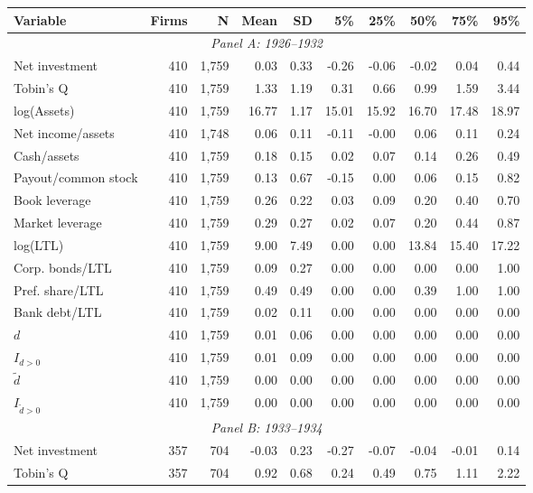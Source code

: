 \begin{threeparttable}
\begin{tabular}{lrrrrrrrrr}
\toprule
Variable & Firms & N & Mean & SD & 5\% & 25\% & 50\% & 75\% & 95\% \\
\midrule
\multicolumn{10}{c}{\textit{Panel A: 1926--1932}} \\
\midrule
Net investment & 410 & 1,759 & 0.03 & 0.33 & -0.26 & -0.06 & -0.02 & 0.04 & 0.44 \\
Tobin's Q & 410 & 1,759 & 1.33 & 1.19 & 0.31 & 0.66 & 0.99 & 1.59 & 3.44 \\
log(Assets) & 410 & 1,759 & 16.77 & 1.17 & 15.01 & 15.92 & 16.70 & 17.48 & 18.97 \\
Net income/assets & 410 & 1,748 & 0.06 & 0.11 & -0.11 & -0.00 & 0.06 & 0.11 & 0.24 \\
Cash/assets & 410 & 1,759 & 0.18 & 0.15 & 0.02 & 0.07 & 0.14 & 0.26 & 0.49 \\
Payout/common stock & 410 & 1,759 & 0.13 & 0.67 & -0.15 & 0.00 & 0.06 & 0.15 & 0.82 \\
Book leverage & 410 & 1,759 & 0.26 & 0.22 & 0.03 & 0.09 & 0.20 & 0.40 & 0.70 \\
Market leverage & 410 & 1,759 & 0.29 & 0.27 & 0.02 & 0.07 & 0.20 & 0.44 & 0.87 \\
log(LTL) & 410 & 1,759 & 9.00 & 7.49 & 0.00 & 0.00 & 13.84 & 15.40 & 17.22 \\
Corp. bonds/LTL & 410 & 1,759 & 0.09 & 0.27 & 0.00 & 0.00 & 0.00 & 0.00 & 1.00 \\
Pref. share/LTL & 410 & 1,759 & 0.49 & 0.49 & 0.00 & 0.00 & 0.39 & 1.00 & 1.00 \\
Bank debt/LTL & 410 & 1,759 & 0.02 & 0.11 & 0.00 & 0.00 & 0.00 & 0.00 & 0.00 \\
\ensuremath{d} & 410 & 1,759 & 0.01 & 0.06 & 0.00 & 0.00 & 0.00 & 0.00 & 0.00 \\
\ensuremath{I_{d>0}} & 410 & 1,759 & 0.01 & 0.09 & 0.00 & 0.00 & 0.00 & 0.00 & 0.00 \\
\ensuremath{\tilde{d}} & 410 & 1,759 & 0.00 & 0.00 & 0.00 & 0.00 & 0.00 & 0.00 & 0.00 \\
\ensuremath{I_{\tilde{d}>0}} & 410 & 1,759 & 0.00 & 0.00 & 0.00 & 0.00 & 0.00 & 0.00 & 0.00 \\
\midrule
\multicolumn{10}{c}{\textit{Panel B: 1933--1934}} \\
\midrule
Net investment & 357 & 704 & -0.03 & 0.23 & -0.27 & -0.07 & -0.04 & -0.01 & 0.14 \\
Tobin's Q & 357 & 704 & 0.92 & 0.68 & 0.24 & 0.49 & 0.75 & 1.11 & 2.22 \\

\end{tabular}
\end{threeparttable}
